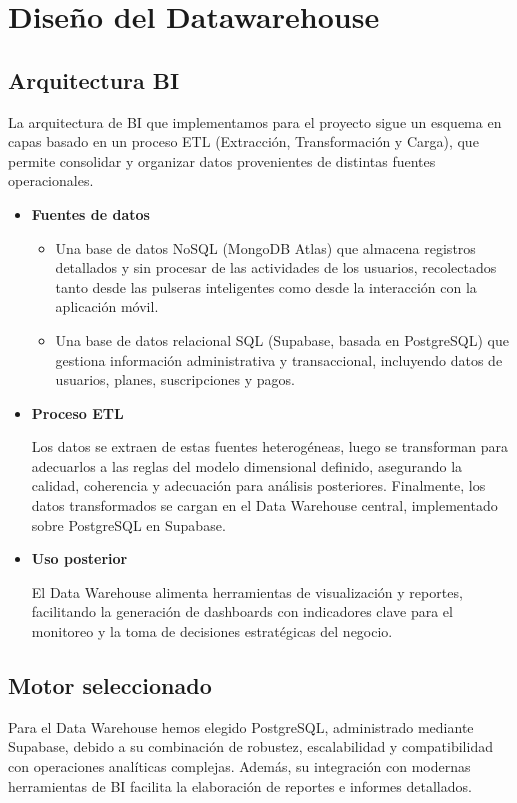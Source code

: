 \section{Diseño del Datawarehouse}
\subsection{Arquitectura BI}
La arquitectura de BI que implementamos para el proyecto sigue un esquema en capas basado en un proceso ETL (Extracción, Transformación y Carga), que permite consolidar y organizar datos provenientes de distintas fuentes operacionales.
\begin{itemize}
    \item {\bfseries Fuentes de datos}
    \begin{itemize}
        \item Una base de datos NoSQL (MongoDB Atlas) que almacena registros detallados y sin procesar de las actividades de los usuarios, recolectados tanto desde las pulseras inteligentes como desde la interacción con la aplicación móvil.
        \item Una base de datos relacional SQL (Supabase, basada en PostgreSQL) que gestiona información administrativa y transaccional, incluyendo datos de usuarios, planes, suscripciones y pagos.
    \end{itemize}
\item{\bfseries Proceso ETL} \par
Los datos se extraen de estas fuentes heterogéneas, luego se transforman para adecuarlos a las reglas del modelo dimensional definido, asegurando la calidad, coherencia y adecuación para análisis posteriores. Finalmente, los datos transformados se cargan en el Data Warehouse central, implementado sobre PostgreSQL en Supabase.
\item{\bfseries Uso posterior} \par
El Data Warehouse alimenta herramientas de visualización y reportes, facilitando la generación de dashboards con indicadores clave para el monitoreo y la toma de decisiones estratégicas del negocio.
\end{itemize}
\subsection{Motor seleccionado}
Para el Data Warehouse hemos elegido PostgreSQL, administrado mediante Supabase, debido a su combinación de robustez, escalabilidad y compatibilidad con operaciones analíticas complejas. Además, su integración con modernas herramientas de BI facilita la elaboración de reportes e informes detallados.




